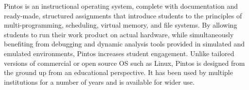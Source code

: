 Pintos is an instructional operating system, complete with documentation
and ready-made, structured assignments that introduce students to
the principles of multi-programming, scheduling, virtual memory,
and file systems.  By allowing students to run their work product on
actual hardware, while simultaneously benefiting from debugging
and dynamic analysis tools provided in simulated and emulated environments,
Pintos increases student engagement.  Unlike tailored versions of
commercial or open source OS such as Linux, Pintos is designed from the
ground up from an educational perspective.  
It has been used by multiple institutions for a number of years and
is available for wider use.
